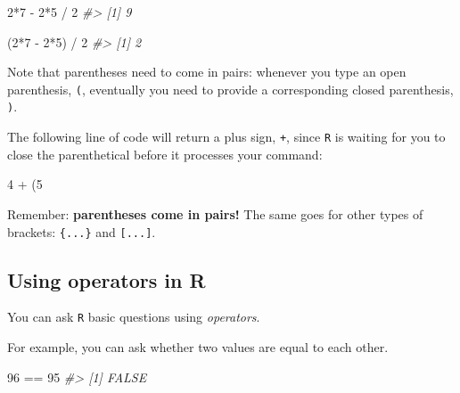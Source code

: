 \documentclass[
]{book}
\newenvironment{Shaded}{\begin{snugshade}}{\end{snugshade}}
\newcommand{\CommentTok}[1]{\textcolor[rgb]{0.56,0.35,0.01}{\textit{#1}}}
\newcommand{\DecValTok}[1]{\textcolor[rgb]{0.00,0.00,0.81}{#1}}
\newcommand{\NormalTok}[1]{#1}
\newcommand{\SpecialCharTok}[1]{\textcolor[rgb]{0.00,0.00,0.00}{#1}}
\begin{document}
\begin{Shaded}
\begin{Highlighting}[]
\DecValTok{2}\SpecialCharTok{*}\DecValTok{7} \SpecialCharTok{{-}} \DecValTok{2}\SpecialCharTok{*}\DecValTok{5} \SpecialCharTok{/} \DecValTok{2}
\CommentTok{\#\textgreater{} [1] 9}
\end{Highlighting}
\end{Shaded}

\begin{Shaded}
\begin{Highlighting}[]
\NormalTok{(}\DecValTok{2}\SpecialCharTok{*}\DecValTok{7} \SpecialCharTok{{-}} \DecValTok{2}\SpecialCharTok{*}\DecValTok{5}\NormalTok{) }\SpecialCharTok{/} \DecValTok{2}
\CommentTok{\#\textgreater{} [1] 2}
\end{Highlighting}
\end{Shaded}

Note that parentheses need to come in pairs: whenever you type an open parenthesis, \texttt{(}, eventually you need to provide a corresponding closed parenthesis, \texttt{)}.

The following line of code will return a plus sign, \texttt{+}, since \texttt{R} is waiting for you to close the parenthetical before it processes your command:

\begin{Shaded}
\begin{Highlighting}[]
\DecValTok{4} \SpecialCharTok{+}\NormalTok{ (}\DecValTok{5}
\end{Highlighting}
\end{Shaded}

Remember: \textbf{parentheses come in pairs!} The same goes for other types of brackets: \texttt{\{...\}} and \texttt{{[}...{]}}.

\hypertarget{using-operators-in-r}{%
\subsection*{Using operators in R}\label{using-operators-in-r}}

You can ask \texttt{R} basic questions using \emph{operators}.

For example, you can ask whether two values are equal to each other.

\begin{Shaded}
\begin{Highlighting}[]
\DecValTok{96} \SpecialCharTok{==} \DecValTok{95}
\CommentTok{\#\textgreater{} [1] FALSE}
\end{Highlighting}
\end{Shaded}
\end{document}
